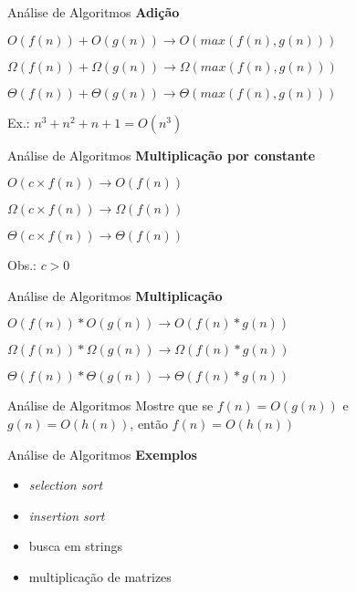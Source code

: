 \documentclass[10pt]{beamer}
\begin{document}
\begin{frame}{Análise de Algoritmos}
  \huge \textbf{Adição}
  \Large

  \bigskip

  $O(f(n)) + O(g(n)) \rightarrow O(max(f(n), g(n)))$

  \bigskip

  $\Omega(f(n)) + \Omega(g(n)) \rightarrow \Omega(max(f(n), g(n)))$

  \bigskip

  $\Theta(f(n)) + \Theta(g(n)) \rightarrow \Theta(max(f(n), g(n)))$

  \bigskip

  Ex.: $n^3 + n^2 + n + 1 = O(n^3)$
\end{frame}

\begin{frame}{Análise de Algoritmos}
  \huge \textbf{Multiplicação por constante}
  \Large

  \bigskip

  $O(c \times f(n)) \rightarrow O(f(n))$

  \bigskip

  $\Omega(c \times f(n)) \rightarrow \Omega(f(n))$

  \bigskip

  $\Theta(c \times f(n)) \rightarrow \Theta(f(n))$

  \bigskip

  Obs.: $c > 0$
\end{frame}

\begin{frame}{Análise de Algoritmos}
  \huge \textbf{Multiplicação}
  \Large

  \bigskip

  $O(f(n)) * O(g(n)) \rightarrow O(f(n) * g(n))$

  \bigskip

  $\Omega(f(n)) * \Omega(g(n)) \rightarrow \Omega(f(n) * g(n))$

  \bigskip

  $\Theta(f(n)) * \Theta(g(n)) \rightarrow \Theta(f(n) * g(n))$
\end{frame}


\begin{frame}{Análise de Algoritmos}
  \Large Mostre que se $f(n) = O(g(n))$ e $g(n) = O(h(n))$, então $f(n) = O(h(n))$
\end{frame}

\begin{frame}{Análise de Algoritmos}
  \huge \textbf{Exemplos}

  \begin{itemize}
    \item \textit{selection sort}
    \item \textit{insertion sort}
    \item busca em strings
    \item multiplicação de matrizes
  \end{itemize}

\end{frame}
\end{document}
